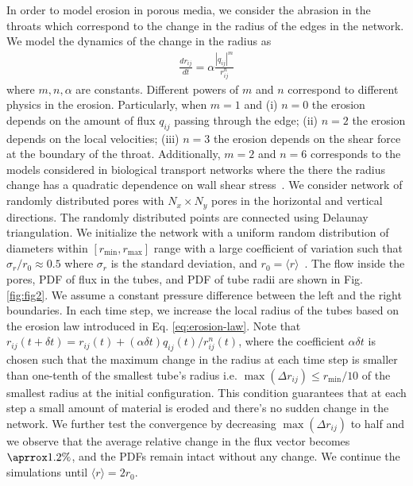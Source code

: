 \documentclass[%
 reprint,
 amsmath,amssymb,
 aps,
]{revtex4-1}
\newcommand{\add}[1]{\noindent \color{blue} #1 \normalcolor}
\begin{document}
In order to model erosion in porous media, we consider the abrasion in the throats which correspond to the change in the radius of the edges in the network. We model the dynamics of the change in the radius as 
%
\begin{align}
   \frac{dr_{ij}}{dt} = \alpha  \frac{|q_{ij}|^m}{r_{ij}^n} \label{eq:erosion-law}
\end{align}
%
\add{where $m,n,\alpha$ are constants. Different powers of $m$ and $n$ correspond to different physics in the erosion. Particularly, when $m=1$ and (i) $n=0$ the erosion depends on the amount of flux $q_{ij}$ passing through the edge; (ii) $n=2$ the erosion depends on the local velocities; (iii) $n=3$ the erosion depends on the shear force at the boundary of the throat.} \add{Additionally, $m=2$ and $n=6$ corresponds to the models considered in biological transport networks where the there the radius change has a quadratic dependence on wall shear stress~\cite{hu2013adaptation,ronellenfitsch2016global}.} We consider network of randomly distributed pores with  $N_x\times N_y$ pores in the horizontal and vertical directions. The randomly distributed points are connected using Delaunay triangulation. We initialize the network with a uniform random distribution of diameters within $[r_\text{min}, r_\text{max}]$ range with a large coefficient of variation such that  $\sigma_r/r_0\approx 0.5$ where $\sigma_r$ is the standard deviation, and $r_0 = \langle r \rangle$~\cite{alim2017local}. The flow inside the pores, PDF of flux in the tubes, and PDF of tube radii are shown in Fig. \ref{fig:fig2}. We assume a constant pressure difference between the left and the right boundaries. In each time step, we increase the local radius of the tubes based on the erosion law introduced in Eq. \eqref{eq:erosion-law}. Note that $r_{ij} (t+\delta t)  = r_{ij} (t)  + (\alpha \delta t)  q_{ij} (t)/ r^n_{ij} (t) $, where the coefficient $\alpha \delta t$ is chosen such that the maximum change in the radius at each time step is smaller than one-tenth  of the smallest tube's radius i.e. $\max (\Delta r_{ij}) \leq r_\text{min}/10$ of the smallest radius at the initial configuration.  This condition guarantees that at each step a small amount of material is eroded and there's no sudden change in the network. We further test the convergence by decreasing $\max(\Delta r_{ij})$ to half and we observe that the average relative change in the flux vector becomes $\aprrox 1.2\%$, and the PDFs remain intact without any change. We continue the simulations until $\langle r \rangle = 2 r_0$. 
%
\end{document}
